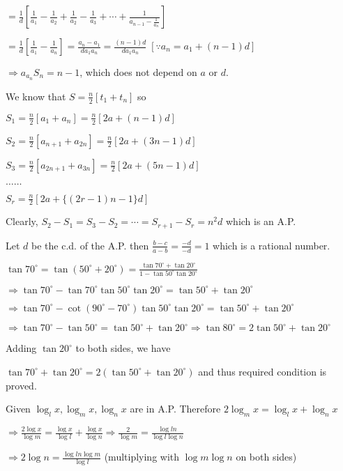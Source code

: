   $= \frac{1}{d}\left[\frac{1}{a_1} - \frac{1}{a_2} + \frac{1}{a_2} - \frac{1}{a_3} + \cdots + \frac{1}{a_{n
        - 1} - \frac{1}{a_n}}\right]$

  $= \frac{1}{d}\left[\frac{1}{a_1} - \frac{1}{a_n}\right] = \frac{a_n - a_1}{da_1a_n} = \frac{(n -
    1)d}{da_1a_n}\;[\because a_n = a_1 + (n - 1)d]$

  $\Rightarrow a_a_nS_n = n - 1$, which does not depend on $a$ or $d$.
\item We know that $S = \frac{n}{2}[t_1 + t_n]$ so

  $S_1 = \frac{n}{2}[a_1 + a_n] = \frac{n}{2}[2a + (n - 1)d]$

  $S_2 = \frac{n}{2}[a_{n + 1} + a_{2n}] = \frac{n}{2}[2a + (3n - 1)d]$

  $S_3 = \frac{n}{2}[a_{2n + 1} + a_{3n}] = \frac{n}{2}[2a + (5n - 1)d]$

  $\ldots\ldots$

  $S_r = \frac{n}{2}[2a + \{(2r - 1)n - 1\}d]$

  Clearly, $S_2 - S_1 = S_3 - S_2 = \cdots = S_{r + 1} - S_r = n^2d$ which is an A.P.
\item Let $d$ be the c.d. of the A.P. then $\frac{b - c}{a - b} = \frac{-d}{-d} = 1$ which is a rational
  number.
\item $\tan70^\circ = \tan(50^\circ + 20^\circ) = \frac{\tan70^\circ + \tan20^\circ}{1 -
  \tan50^\circ\tan20^\circ}$

  $\Rightarrow \tan70^\circ - \tan70^\circ\tan50^\circ\tan20^\circ = \tan50^\circ + \tan20^\circ$

  $\Rightarrow \tan70^\circ - \cot(90^\circ - 70^\circ)\tan50^\circ\tan20^\circ = \tan50^\circ +
  \tan20^\circ$

  $\Rightarrow \tan70^\circ - \tan50^\circ = \tan50^\circ + \tan20^\circ \Rightarrow \tan80^\circ =
  2\tan50^\circ + \tan20^\circ$

  Adding $\tan{20}^\circ$ to both sides, we have

  $\tan70^\circ + \tan20^\circ = 2(\tan50^\circ + \tan20^\circ)$ and thus required condition is proved.
\item Given $\log_l x, \log_m x, \log_n x$ are in A.P. Therefore $2\log_mx = \log_lx + \log_nx$

  $\Rightarrow \frac{2\log x}{\log m} = \frac{\log x}{\log l} + \frac{\log x}{\log n} \Rightarrow
  \frac{2}{\log m} = \frac{\log ln}{\log l\log n}$

  $\Rightarrow 2\log n = \frac{\log ln\log m}{\log l}$ (multiplying with $\log m\log n$ on both sides)

